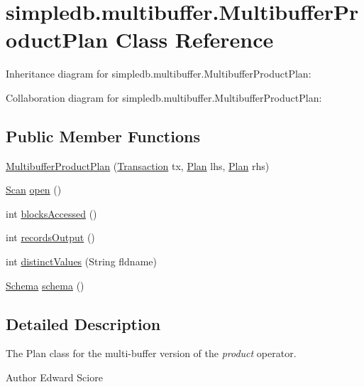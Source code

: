 \hypertarget{classsimpledb_1_1multibuffer_1_1MultibufferProductPlan}{}\section{simpledb.\+multibuffer.\+Multibuffer\+Product\+Plan Class Reference}
\label{classsimpledb_1_1multibuffer_1_1MultibufferProductPlan}


Inheritance diagram for simpledb.\+multibuffer.\+Multibuffer\+Product\+Plan\+:


Collaboration diagram for simpledb.\+multibuffer.\+Multibuffer\+Product\+Plan\+:
\subsection*{Public Member Functions}
\begin{DoxyCompactItemize}
\item 
\hyperlink{classsimpledb_1_1multibuffer_1_1MultibufferProductPlan_aaf644634c282204e7e18014c34481e05}{Multibuffer\+Product\+Plan} (\hyperlink{classsimpledb_1_1tx_1_1Transaction}{Transaction} tx, \hyperlink{interfacesimpledb_1_1plan_1_1Plan}{Plan} lhs, \hyperlink{interfacesimpledb_1_1plan_1_1Plan}{Plan} rhs)
\item 
\hyperlink{interfacesimpledb_1_1query_1_1Scan}{Scan} \hyperlink{classsimpledb_1_1multibuffer_1_1MultibufferProductPlan_a0874bcf0d5bb9839346404d40b06eaed}{open} ()
\item 
int \hyperlink{classsimpledb_1_1multibuffer_1_1MultibufferProductPlan_a5e3555f5da62f198a1d0e8d1b73a3d0d}{blocks\+Accessed} ()
\item 
int \hyperlink{classsimpledb_1_1multibuffer_1_1MultibufferProductPlan_a45cef849c8ac76cce183b7d9909929c1}{records\+Output} ()
\item 
int \hyperlink{classsimpledb_1_1multibuffer_1_1MultibufferProductPlan_a94df401d9ea9f4da99e4851fc5be731a}{distinct\+Values} (String fldname)
\item 
\hyperlink{classsimpledb_1_1record_1_1Schema}{Schema} \hyperlink{classsimpledb_1_1multibuffer_1_1MultibufferProductPlan_a8cc53b6bf91a6d7f28ce76c0c226a93f}{schema} ()
\end{DoxyCompactItemize}


\subsection{Detailed Description}
The Plan class for the multi-\/buffer version of the {\itshape product} operator. \begin{DoxyAuthor}{Author}
Edward Sciore 
\end{DoxyAuthor}


